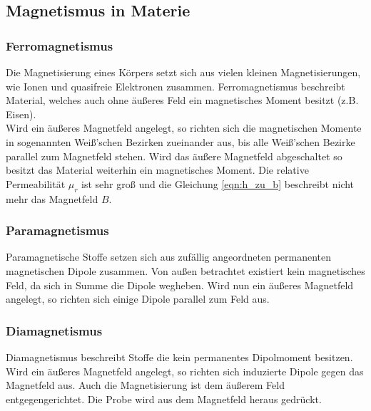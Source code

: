 \subsection{Magnetismus in Materie}
\subsubsection{Ferromagnetismus}
Die Magnetisierung eines Körpers setzt sich aus vielen kleinen Magnetisierungen, wie Ionen und quasifreie Elektronen zusammen.
Ferromagnetismus beschreibt Material, welches auch ohne äußeres Feld ein magnetisches Moment besitzt (z.B. Eisen).\\
Wird ein äußeres Magnetfeld angelegt, so richten sich die magnetischen Momente in sogenannten Weiß'schen Bezirken zueinander aus,
bis alle Weiß'schen Bezirke parallel zum Magnetfeld stehen. Wird das äußere Magnetfeld abgeschaltet so besitzt das Material weiterhin
ein magnetisches Moment. Die relative Permeabilität $\mu_r$ ist sehr groß und die Gleichung \eqref{eqn:h_zu_b} beschreibt nicht mehr
das Magnetfeld $B$.\\

\subsubsection{Paramagnetismus}
Paramagnetische Stoffe setzen sich aus zufällig angeordneten permanenten magnetischen Dipole zusammen. Von außen betrachtet existiert kein
magnetisches Feld, da sich in Summe die Dipole wegheben. Wird nun ein äußeres Magnetfeld angelegt, so richten
sich einige Dipole parallel zum Feld aus.

\subsubsection{Diamagnetismus}
Diamagnetismus beschreibt Stoffe die kein permanentes Dipolmoment besitzen. Wird ein äußeres Magnetfeld angelegt, so richten sich
induzierte Dipole gegen das Magnetfeld aus. Auch die Magnetisierung ist dem äußerem Feld entgegengerichtet. Die Probe wird aus dem Magnetfeld heraus gedrückt.

